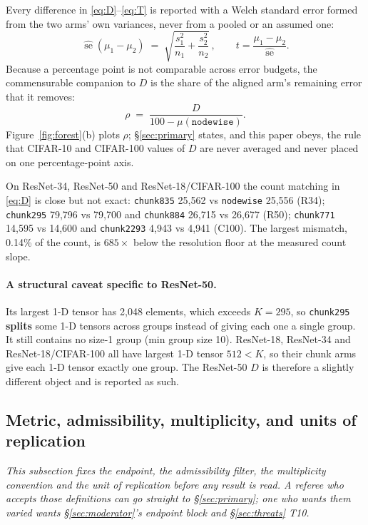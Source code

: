 \documentclass[10pt,letterpaper]{article}
\newcommand{\Dstat}{D}                         %
\newcommand{\arm}[1]{\texttt{#1}}
\DeclareMathOperator{\se}{se}
\begin{document}
Every difference in \eqref{eq:D}--\eqref{eq:T} is reported with a Welch standard error
\citep{welch1947generalization} formed from the two arms' own variances, never from a pooled or
an assumed one:
\begin{equation}
\widehat{\se}(\mu_1-\mu_2)\;=\;\sqrt{\frac{s_1^{2}}{n_1}+\frac{s_2^{2}}{n_2}}\,,
\qquad t=\frac{\mu_1-\mu_2}{\widehat{\se}} .
\label{eq:welch}
\end{equation}
Because a percentage point is not comparable across error budgets, the commensurable companion
to $\Dstat$ is the share of the aligned arm's remaining error that it removes:
\begin{equation}
\rho \;=\; \frac{\Dstat}{100 - \mu(\arm{nodewise})} .
\label{eq:rho}
\end{equation}
Figure~\ref{fig:forest}(b) plots $\rho$; \S\ref{sec:primary} states, and this paper obeys, the
rule that CIFAR-10 and CIFAR-100 values of $\Dstat$ are never averaged and never placed on one
percentage-point axis.

On ResNet-34, ResNet-50 and ResNet-18/CIFAR-100 the count matching in \eqref{eq:D} is close but
not exact: \arm{chunk835} 25{,}562 vs \arm{nodewise} 25{,}556 (R34); \arm{chunk295} 79{,}796 vs
79{,}700 and \arm{chunk884} 26{,}715 vs 26{,}677 (R50); \arm{chunk771} 14{,}595 vs 14{,}600 and
\arm{chunk2293} 4{,}943 vs 4{,}941 (C100). The largest mismatch, 0.14\% of the count, is
$685\times$ below the resolution floor at the measured count slope.

\paragraph{A structural caveat specific to ResNet-50.}
Its largest 1-D tensor has 2{,}048 elements, which exceeds $K = 295$, so \arm{chunk295}
\textbf{splits} some 1-D tensors across groups instead of giving each one a single group. It
still contains no size-1 group (min group size 10). ResNet-18, ResNet-34 and
ResNet-18/CIFAR-100 all have largest 1-D tensor $512 < K$, so their chunk arms give each 1-D
tensor exactly one group. The ResNet-50 $\Dstat$ is therefore a slightly different object and
is reported as such.

\subsection{Metric, admissibility, multiplicity, and units of replication}
\label{sec:metric}

\emph{This subsection fixes the endpoint, the admissibility filter, the multiplicity convention
and the unit of replication before any result is read. A referee who accepts those definitions can
go straight to \S\ref{sec:primary}; one who wants them varied wants
\S\ref{sec:moderator}'s endpoint block and \S\ref{sec:threats} T10.}
\end{document}
